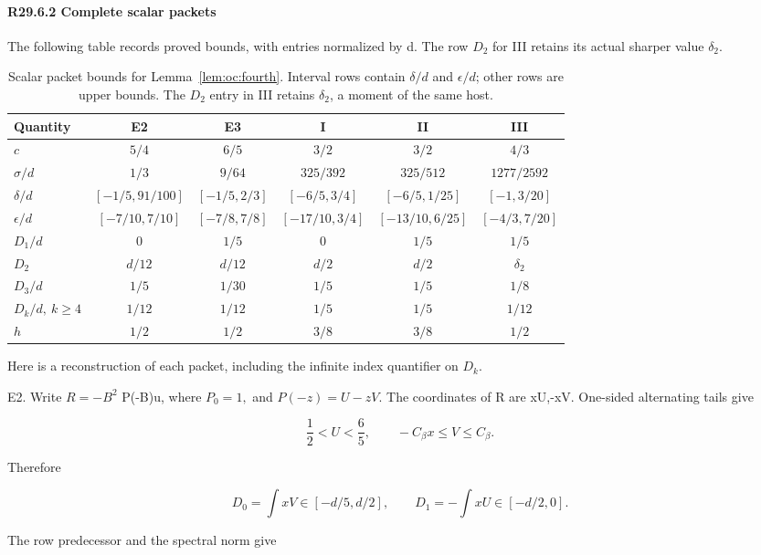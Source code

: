 \paragraph{R29.6.2 Complete scalar packets}

The following table records proved bounds, with entries normalized by d.
The row \(D_2\) for III retains its actual sharper value \(\delta_2.\)

\begin{table}[htbp]
\centering\small
\setlength{\tabcolsep}{5pt}
\caption{Scalar packet bounds for Lemma~\ref{lem:oc:fourth}. Interval rows contain $\delta/d$ and $\epsilon/d$; other rows are upper bounds. The $D_2$ entry in III retains $\delta_2$, a moment of the same host.}\label{tab:oc:r29-packets}
\begin{tabular}{lccccc}
\toprule
Quantity & E2 & E3 & I & II & III\\
\midrule
$c$ & $5/4$ & $6/5$ & $3/2$ & $3/2$ & $4/3$\\
$\sigma/d$ & $1/3$ & $9/64$ & $325/392$ & $325/512$ & $1277/2592$\\
$\delta/d$ & $[-1/5,91/100]$ & $[-1/5,2/3]$ & $[-6/5,3/4]$ & $[-6/5,1/25]$ & $[-1,3/20]$\\
$\epsilon/d$ & $[-7/10,7/10]$ & $[-7/8,7/8]$ & $[-17/10,3/4]$ & $[-13/10,6/25]$ & $[-4/3,7/20]$\\
$D_1/d$ & $0$ & $1/5$ & $0$ & $1/5$ & $1/5$\\
$D_2$ & $d/12$ & $d/12$ & $d/2$ & $d/2$ & $\delta_2$\\
$D_3/d$ & $1/5$ & $1/30$ & $1/5$ & $1/5$ & $1/8$\\
$D_k/d,\ k\ge4$ & $1/12$ & $1/12$ & $1/5$ & $1/5$ & $1/12$\\
$h$ & $1/2$ & $1/2$ & $3/8$ & $3/8$ & $1/2$\\
\bottomrule
\end{tabular}
\end{table}

Here is a reconstruction of each packet, including the infinite index
quantifier on \(D_k.\)

E2. Write \(R=-B^2\) P(-B)u, where \(P_0=1,\allowbreak \) and
\(P(-z)=U-zV.\) The coordinates of R are xU,-xV.
One-sided alternating tails give

\[
\frac12<U<\frac65,\qquad -C_\beta x\le V\le C_\beta.
\]

Therefore

\[
D_0=\int xV\in[-d/5,d/2],\qquad
D_1=-\int xU\in[-d/2,0].
\]

The row predecessor and the spectral norm give


